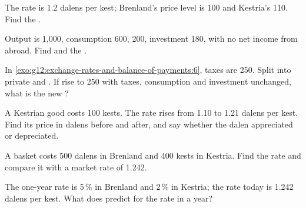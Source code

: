 \begin{exercise}[$\star$]\label{exo:g12:exchange-rates-and-balance-of-payments:5}
The rate is 1.2 dalens per kest; Brenland's price level is 100 and Kestria's 110. Find the .
\end{exercise}

\begin{exercise}[$\star\star$]\label{exo:g12:exchange-rates-and-balance-of-payments:6}
Output is 1,000, consumption 600,  200, investment 180, with no net income from abroad. Find  and the .
\end{exercise}

\begin{exercise}[$\star\star$]\label{exo:g12:exchange-rates-and-balance-of-payments:7}
In \cref{exo:g12:exchange-rates-and-balance-of-payments:6}, taxes are 250. Split  into private and . If  rise to 250 with
taxes, consumption and investment unchanged, what is the new ?
\end{exercise}

\begin{exercise}[$\star\star$]\label{exo:g12:exchange-rates-and-balance-of-payments:8}
A Kestrian good costs 100 kests. The rate rises from 1.10 to 1.21 dalens per kest. Find its price in dalens before and after, and say whether the dalen appreciated or
depreciated.
\end{exercise}

\begin{exercise}[$\star\star$]\label{exo:g12:exchange-rates-and-balance-of-payments:9}
A basket costs 500 dalens in Brenland and 400 kests in Kestria. Find the  rate and compare it with a market rate of 1.242.
\end{exercise}

\begin{exercise}[$\star\star$]\label{exo:g12:exchange-rates-and-balance-of-payments:10}
The one-year rate is 5\,\% in Brenland and 2\,\% in Kestria; the rate today is 1.242 dalens per kest. What does  predict for the rate in a year?
\end{exercise}

